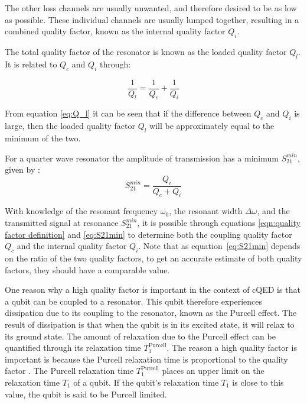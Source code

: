     The other loss channels are usually unwanted, and therefore desired to be as low as possible. These individual channels are usually lumped together, resulting in a combined quality factor, known as the internal quality factor $Q_i$.

    The total quality factor of the resonator is known as the loaded quality factor $Q_l$. It is related to $Q_c$ and $Q_i$ through:

    \begin{equation}
        \frac{1}{Q_l} = \frac{1}{Q_c} + \frac{1}{Q_i}
        \label{eq:Q_l}
    \end{equation}

    From equation \ref{eq:Q_l} it can be seen that if the difference between $Q_c$ and $Q_i$ is large, then the loaded quality factor $Q_l$ will be approximately equal to the minimum of the two.


    For a quarter wave resonator the amplitude of transmission has a minimum $S_{21}^{min}$, given by \cite[p29]{Mazin}:
    \begin{equation}
        S_{21}^{min} = \frac{Q_c}{Q_c + Q_i}
        \label{eq:S21min}
    \end{equation}

    With knowledge of the resonant frequency $\omega_0$, the resonant width $\Delta \omega$, and the transmitted signal at resonance $S_{21}^{min}$, it is possible through equations \ref{eqn:quality factor definition} and \ref{eq:S21min} to determine both the coupling quality factor $Q_c$ and the internal quality factor $Q_i$. Note that as equation~\ref{eq:S21min} depends on the ratio of the two quality factors, to get an accurate estimate of both quality factors, they should have a comparable value.

    One reason why a high quality factor is important in the context of cQED is that a qubit can be coupled to a resonator. This qubit therefore experiences dissipation due to its coupling to the resonator, known as the Purcell effect. The result of dissipation is that when the qubit is in its excited state, it will relax to its ground state. The amount of relaxation due to the Purcell effect can be quantified through its relaxation time $T_1^\text{Purcell}$. The reason a high quality factor is important is because the Purcell relaxation time is proportional to the quality factor \cite[p~22]{Geerlings}. The Purcell relaxation time $T_1^\text{Purcell}$ places an upper limit on the relaxation time $T_1$ of a qubit. If the qubit's relaxation time $T_1$ is close to this value, the qubit is said to be Purcell limited.



